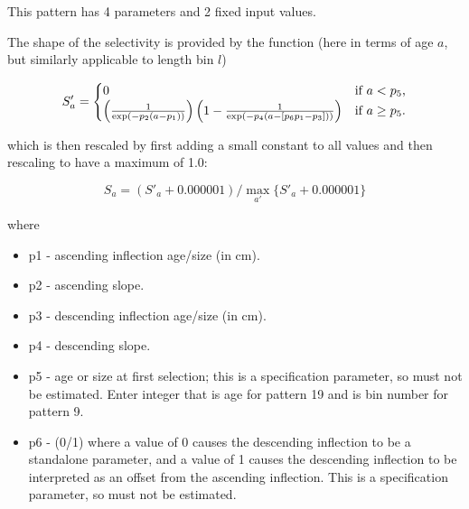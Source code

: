 \hypertarget{SimpleDoubleLog}{}

This pattern has 4 parameters and 2 fixed input values.

The shape of the selectivity is provided by the function (here in terms of age $a$, but similarly applicable to length bin $l$)

\begin{equation}
    S'_a =  
    \begin{cases}
      \hfil 0 & \text{if $a < p_5$,} \\
      \left( \frac{1}{\exp\left(-p_2 \left( a - p_1 \right) \right) } \right)
      \left(1 - \frac{1}{\exp\left(-p_4 \left( a - [p_6 p_1 - p_3]\right) \right) } \right)
      & \text{if $a \geq p_5$.}
    \end{cases}
 \end{equation}

which is then rescaled by first adding a small constant to all values and then rescaling to have a maximum of 1.0:
 
 \begin{equation}
    S_a = (S'_a + 0.000001) / \max_{a'}\{S'_a + 0.000001\}
 \end{equation}

where
	\begin{itemize}
		\item p1 - ascending inflection age/size (in cm).
		\item p2 - ascending slope. 
		\item p3 - descending inflection age/size (in cm).
		\item p4 - descending slope.
		\item p5 - age or size at first selection; this is a specification parameter, so must not be estimated. Enter integer that is age for pattern 19 and is bin number for pattern 9.
		\item p6 - (0/1) where a value of 0 causes the descending inflection to be a standalone parameter, and a value of 1 causes the descending inflection to be interpreted as an offset from the ascending inflection. This is a specification parameter, so must not be estimated.
	\end{itemize}

